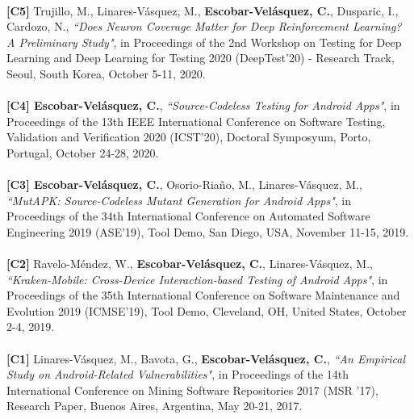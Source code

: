\documentclass[letterpaper,11pt,oneside]{article}
\begin{document}
\\\newpage
\noindent \textbf{[C5]} Trujillo, M., Linares-V\'asquez,  M., \textbf{Escobar-Velásquez, C.}, Dusparic, I., Cardozo, N., \textit{``Does Neuron Coverage Matter for Deep Reinforcement Learning? A Preliminary Study"}, in Proceedings of the 2nd Workshop on Testing for Deep Learning and Deep Learning for Testing 2020 (DeepTest’20) - Research Track, Seoul, South Korea, October 5-11, 2020. \\\\
\noindent \textbf{[C4] Escobar-Velásquez, C.}, \textit{``Source-Codeless Testing for Android Apps"}, in Proceedings of the 13th IEEE International Conference on Software Testing, Validation and Verification 2020 (ICST’20), Doctoral Symposyum, Porto, Portugal, October 24-28, 2020. \\\\
\noindent \textbf{[C3] Escobar-Velásquez, C.}, Osorio-Riaño, M., Linares-Vásquez, M., \textit{``MutAPK: Source-Codeless Mutant Generation for Android Apps"}, in Proceedings of the 34th International Conference on Automated Software Engineering 2019 (ASE’19), Tool Demo, San Diego, USA, November 11-15, 2019. \\\\
\noindent \textbf{[C2]} Ravelo-Méndez, W., \textbf{Escobar-Velásquez, C.}, Linares-Vásquez, M., \textit{``Kraken-Mobile: Cross-Device Interaction-based Testing of Android Apps"}, in Proceedings of the 35th International Conference on Software Maintenance and Evolution 2019 (ICMSE’19), Tool Demo, Cleveland, OH, United States, October 2-4, 2019. \\\\
\noindent \textbf{[C1]} Linares-Vásquez, M., Bavota, G., \textbf{Escobar-Velásquez, C.}, \textit{``An Empirical Study on Android-Related Vulnerabilities"}, in Proceedings of the 14th International Conference on Mining Software Repositories 2017 (MSR ’17), Research Paper, Buenos Aires, Argentina, May 20-21, 2017. \\
\end{document}
